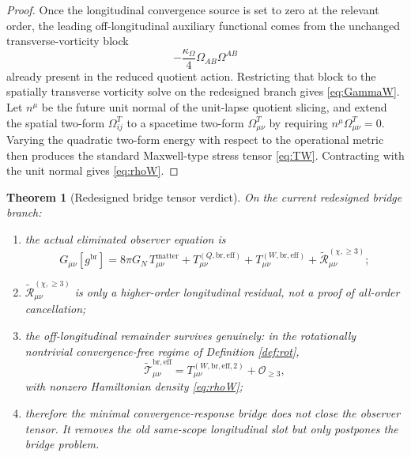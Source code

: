 \documentclass[11pt]{article}
\newcommand{\ReEff}{\widetilde{\mathcal T}_{\mu\nu}^{\mathrm{br,eff}}}
\newcommand{\ReLong}{\widetilde{\mathcal R}_{\mu\nu}^{(\chi,\ge 3)}}
\newtheorem{theorem}{Theorem}
\begin{document}
\begin{proof}
Once the longitudinal convergence source is set to zero at the relevant order, the leading off-longitudinal auxiliary functional comes from the unchanged transverse-vorticity block
\[
-\frac{\kappa_\Omega}{4}\Omega_{AB}\Omega^{AB}
\]
already present in the reduced quotient action. Restricting that block to the spatially transverse vorticity solve on the redesigned branch gives \eqref{eq:GammaW}. Let \(n^\mu\) be the future unit normal of the unit-lapse quotient slicing, and extend the spatial two-form \(\Omega_{ij}^T\) to a spacetime two-form \(\Omega_{\mu\nu}^T\) by requiring \(n^\mu\Omega_{\mu\nu}^T=0\). Varying the quadratic two-form energy with respect to the operational metric then produces the standard Maxwell-type stress tensor \eqref{eq:TW}. Contracting with the unit normal gives \eqref{eq:rhoW}.
\end{proof}

\begin{theorem}[Redesigned bridge tensor verdict]
\label{thm:verdict}
On the current redesigned bridge branch:
\begin{enumerate}
    \item the actual eliminated observer equation is
    \begin{equation}
    G_{\mu\nu}[g^{\mathrm{br}}]
    =
    8\pi G_N\,T_{\mu\nu}^{\mathrm{matter}}
    +T_{\mu\nu}^{(Q,\mathrm{br,eff})}
    +T_{\mu\nu}^{(W,\mathrm{br,eff})}
    +\ReLong;
    \label{eq:full}
    \end{equation}
    \item \(\ReLong\) is only a higher-order longitudinal residual, not a proof of all-order cancellation;
    \item the off-longitudinal remainder survives genuinely: in the rotationally nontrivial convergence-free regime of Definition \ref{def:rot},
    \begin{equation}
    \ReEff
    =
    T_{\mu\nu}^{(W,\mathrm{br,eff},2)}
    +\mathcal O_{\ge 3},
    \label{eq:survive}
    \end{equation}
    with nonzero Hamiltonian density \eqref{eq:rhoW};
    \item therefore the minimal convergence-response bridge does \emph{not} close the observer tensor. It removes the old same-scope longitudinal slot but only postpones the bridge problem.
\end{enumerate}
\end{theorem}
\end{document}

